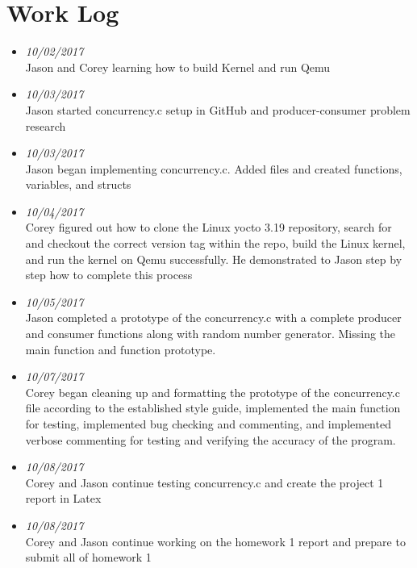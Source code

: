 \documentclass[onecolumn, draftclsnofoot,10pt, compsoc]{IEEEtran}
\begin{document}
\section{Work Log}
\begin{itemize}

\item \textit{10/02/2017}\\ Jason and Corey learning how to build Kernel and run Qemu \\
\item \textit{10/03/2017}\\ Jason started concurrency.c setup in GitHub and producer-consumer problem research\\
\item \textit{10/03/2017}\\ Jason began implementing concurrency.c. Added files and created functions, variables, and structs  \\
\item \textit{10/04/2017}\\ Corey figured out how to clone the Linux yocto 3.19 repository, search for and checkout the correct version tag within the repo, build the Linux kernel, and run the kernel on Qemu successfully. He demonstrated to Jason step by step how to complete this process\\ 
\item \textit{10/05/2017}\\ Jason completed a prototype of the concurrency.c with a complete producer and consumer functions along with random number generator. Missing the main function and function prototype. \\
\item \textit{10/07/2017}\\ Corey began cleaning up and formatting the prototype of the concurrency.c file according to the established style guide, implemented the main function for testing, implemented bug checking and commenting, and implemented verbose commenting for testing and verifying the accuracy of the program. \\
\item \textit{10/08/2017}\\ Corey and Jason continue testing concurrency.c and create the project 1 report in Latex \\
\item \textit{10/08/2017}\\ Corey and Jason continue working on the homework 1 report and prepare to submit all of homework 1 \\

\end{itemize}
\end{document}
